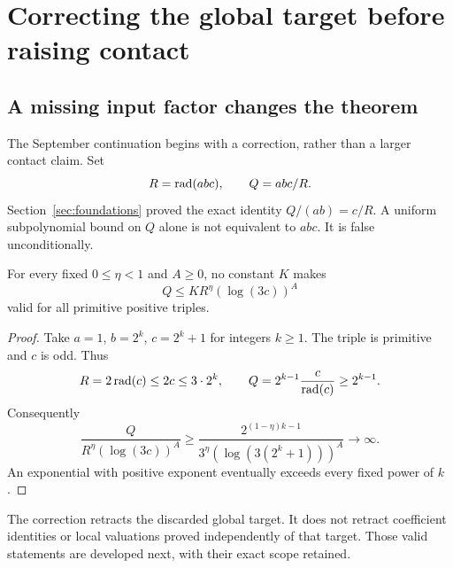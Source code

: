 \section{Correcting the global target before raising contact}\label{sec:correction}
\subsection{A missing input factor changes the theorem}
The September continuation begins with a correction, rather than a larger contact claim. Set
\[
 R=\operatorname{rad}(abc),\qquad Q=abc/R.
\]
Section~\ref{sec:foundations} proved the exact identity $Q/(ab)=c/R$. A uniform subpolynomial bound on $Q$ alone is not equivalent to $abc$. It is false unconditionally.

\begin{theorem}\label{thm:false-target}
For every fixed $0\le\eta<1$ and $A\ge0$, no constant $K$ makes
\[
 Q\le K R^\eta(\log(3c))^A
\]
valid for all primitive positive triples.
\end{theorem}
\begin{proof}
Take $a=1$, $b=2^k$, $c=2^k+1$ for integers $k\ge1$. The triple is primitive and $c$ is odd. Thus
\[
 R=2\operatorname{rad}(c)\le2c\le3\cdot2^k,
 \qquad Q=2^{k-1}\frac c{\operatorname{rad}(c)}\ge2^{k-1}.
\]
Consequently
\[
 \frac{Q}{R^\eta(\log(3c))^A}
 \ge\frac{2^{(1-\eta)k-1}}{3^\eta(\log(3(2^k+1)))^A}\longrightarrow\infty.
\]
An exponential with positive exponent eventually exceeds every fixed power of $k$.
\end{proof}

The correction retracts the discarded global target. It does not retract coefficient identities or local valuations proved independently of that target. Those valid statements are developed next, with their exact scope retained.

